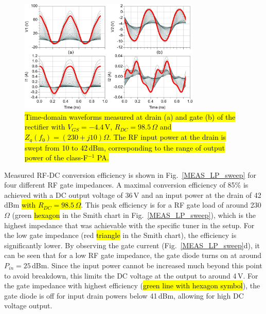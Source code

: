\documentclass[journal]{IEEEtran}
\begin{document}
\begin{figure}[ht!]
\centering
\includegraphics[width=3.4in]{pdf/11.png}
\caption{\hl{Time-domain waveforms measured at drain (a) and gate (b) of the rectifier with $V_{GS}=-4.4$\,V, $R_{DC}=98.5$\,$\Omega$ and $Z_g(f_0)=\left(230+j10\right)\Omega$. The RF input power at the drain is swept from 10 to 42\,dBm, corresponding to the range of output power of the class-F$^{-1}$ PA.}}
\label{time-domain}
\end{figure}

Measured RF-DC conversion efficiency is shown in Fig.~\ref{MEAS_LP_sweep} for four different RF gate impedances. A maximal conversion efficiency of 85\% is achieved with a DC output voltage of 36\,V and an input power at the drain of 42\,dBm \hl{with $R_{DC}=98.5\,\Omega$}. This peak efficiency is for a RF gate load of around 230\,$\Omega$ (green \hl{hexagon} in the Smith chart in Fig.~\ref{MEAS_LP_sweep}), which is the highest impedance that was achievable with the specific tuner in the setup. For the low gate impedance (red \hl{triangle} in the Smith chart), the efficiency is significantly lower. By observing the gate current (Fig.~\ref{MEAS_LP_sweep}d), it can be seen that for a low RF gate impedance, the gate diode turns on at around $P_{in}=25$\,dBm. Since the input power cannot be increased much beyond this point to avoid breakdown, this limits the DC voltage at the output to around 4\,V. For the gate impedance with highest efficiency (\hl{green line with hexagon symbol}), the gate diode is off for input drain powers below 41\,dBm, allowing for high DC voltage output.


\end{document}
